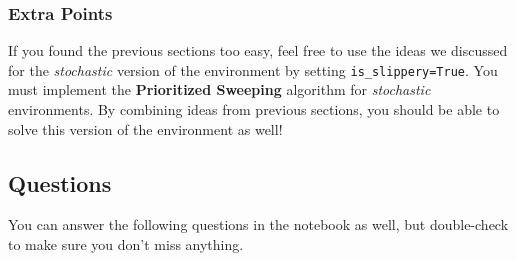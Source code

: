 \subsubsection{Extra Points} 
If you found the previous sections too easy, feel free to use the ideas we discussed for the \textit{stochastic} version of the environment by setting \texttt{is\_slippery=True}. 
You must implement the \textbf{Prioritized Sweeping} algorithm for \textit{stochastic} environments. 
By combining ideas from previous sections, you should be able to solve this version of the environment as well!

\subsection{Questions}\label{sec:dyna-questions} 
You can answer the following questions in the notebook as well, but double-check to make sure you don't miss anything.


